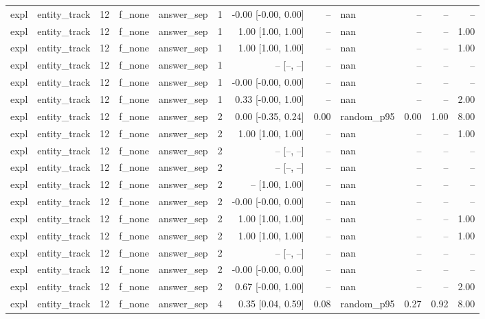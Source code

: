 \begin{tabular}{llrllrrrlrrr}
expl & entity\_track & 12 & f\_none & answer\_sep & 1 & -0.00 [-0.00, 0.00] & -- & nan & -- & -- & -- \\
expl & entity\_track & 12 & f\_none & answer\_sep & 1 & 1.00 [1.00, 1.00] & -- & nan & -- & -- & 1.00 \\
expl & entity\_track & 12 & f\_none & answer\_sep & 1 & 1.00 [1.00, 1.00] & -- & nan & -- & -- & 1.00 \\
expl & entity\_track & 12 & f\_none & answer\_sep & 1 & -- [--, --] & -- & nan & -- & -- & -- \\
expl & entity\_track & 12 & f\_none & answer\_sep & 1 & -0.00 [-0.00, 0.00] & -- & nan & -- & -- & -- \\
expl & entity\_track & 12 & f\_none & answer\_sep & 1 & 0.33 [-0.00, 1.00] & -- & nan & -- & -- & 2.00 \\
expl & entity\_track & 12 & f\_none & answer\_sep & 2 & 0.00 [-0.35, 0.24] & 0.00 & random\_p95 & 0.00 & 1.00 & 8.00 \\
expl & entity\_track & 12 & f\_none & answer\_sep & 2 & 1.00 [1.00, 1.00] & -- & nan & -- & -- & 1.00 \\
expl & entity\_track & 12 & f\_none & answer\_sep & 2 & -- [--, --] & -- & nan & -- & -- & -- \\
expl & entity\_track & 12 & f\_none & answer\_sep & 2 & -- [--, --] & -- & nan & -- & -- & -- \\
expl & entity\_track & 12 & f\_none & answer\_sep & 2 & -- [1.00, 1.00] & -- & nan & -- & -- & -- \\
expl & entity\_track & 12 & f\_none & answer\_sep & 2 & -0.00 [-0.00, 0.00] & -- & nan & -- & -- & -- \\
expl & entity\_track & 12 & f\_none & answer\_sep & 2 & 1.00 [1.00, 1.00] & -- & nan & -- & -- & 1.00 \\
expl & entity\_track & 12 & f\_none & answer\_sep & 2 & 1.00 [1.00, 1.00] & -- & nan & -- & -- & 1.00 \\
expl & entity\_track & 12 & f\_none & answer\_sep & 2 & -- [--, --] & -- & nan & -- & -- & -- \\
expl & entity\_track & 12 & f\_none & answer\_sep & 2 & -0.00 [-0.00, 0.00] & -- & nan & -- & -- & -- \\
expl & entity\_track & 12 & f\_none & answer\_sep & 2 & 0.67 [-0.00, 1.00] & -- & nan & -- & -- & 2.00 \\
expl & entity\_track & 12 & f\_none & answer\_sep & 4 & 0.35 [0.04, 0.59] & 0.08 & random\_p95 & 0.27 & 0.92 & 8.00 \\

\end{tabular}
